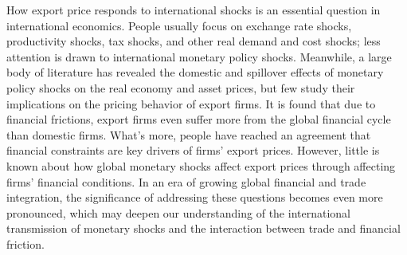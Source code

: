 How export price responds to international shocks is an essential question in international economics. People usually focus on exchange rate shocks, productivity shocks, tax shocks, and other real demand and cost shocks; less attention is drawn to international monetary policy shocks. Meanwhile, a large body of literature has revealed the domestic and spillover effects of monetary policy shocks on the real economy and asset prices, but few study their implications on the pricing behavior of export firms. It is found that due to financial frictions, export firms even suffer more from the global financial cycle than domestic firms. What's more, people have reached an agreement that financial constraints are key drivers of firms' export prices. However, little is known about how global monetary shocks affect export prices through affecting firms' financial conditions. In an era of growing global financial and trade integration, the significance of addressing these questions becomes even more pronounced, which may deepen our understanding of the international transmission of monetary shocks and the interaction between trade and financial friction.


